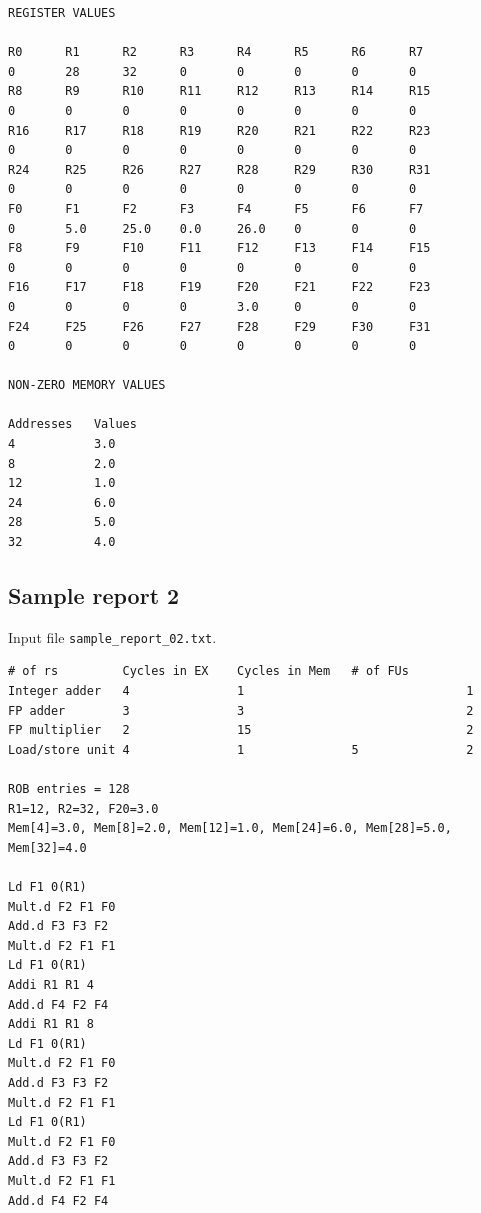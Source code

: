 \documentclass[11pt]{article}
\begin{document}
\begin{Verbatim}[fontsize=\scriptsize]
REGISTER VALUES

R0      R1      R2      R3      R4      R5      R6      R7      
0       28      32      0       0       0       0       0       
R8      R9      R10     R11     R12     R13     R14     R15     
0       0       0       0       0       0       0       0       
R16     R17     R18     R19     R20     R21     R22     R23     
0       0       0       0       0       0       0       0       
R24     R25     R26     R27     R28     R29     R30     R31     
0       0       0       0       0       0       0       0       
F0      F1      F2      F3      F4      F5      F6      F7      
0       5.0     25.0    0.0     26.0    0       0       0       
F8      F9      F10     F11     F12     F13     F14     F15     
0       0       0       0       0       0       0       0       
F16     F17     F18     F19     F20     F21     F22     F23     
0       0       0       0       3.0     0       0       0       
F24     F25     F26     F27     F28     F29     F30     F31     
0       0       0       0       0       0       0       0       

NON-ZERO MEMORY VALUES

Addresses   Values
4           3.0
8           2.0
12          1.0
24          6.0
28          5.0
32          4.0
\end{Verbatim}
\clearpage
\subsection{Sample report 2}
Input file \texttt{sample\_report\_02.txt}.
\begin{Verbatim}[fontsize=\footnotesize]
               # of rs         Cycles in EX    Cycles in Mem   # of FUs
Integer adder   4               1                               1
FP adder        3               3                               2
FP multiplier   2               15                              2
Load/store unit 4               1               5               2

ROB entries = 128
R1=12, R2=32, F20=3.0
Mem[4]=3.0, Mem[8]=2.0, Mem[12]=1.0, Mem[24]=6.0, Mem[28]=5.0, Mem[32]=4.0

Ld F1 0(R1)
Mult.d F2 F1 F0
Add.d F3 F3 F2
Mult.d F2 F1 F1
Ld F1 0(R1)
Addi R1 R1 4
Add.d F4 F2 F4
Addi R1 R1 8
Ld F1 0(R1)
Mult.d F2 F1 F0
Add.d F3 F3 F2
Mult.d F2 F1 F1
Ld F1 0(R1)
Mult.d F2 F1 F0
Add.d F3 F3 F2
Mult.d F2 F1 F1
Add.d F4 F2 F4
\end{Verbatim}
\end{document}
